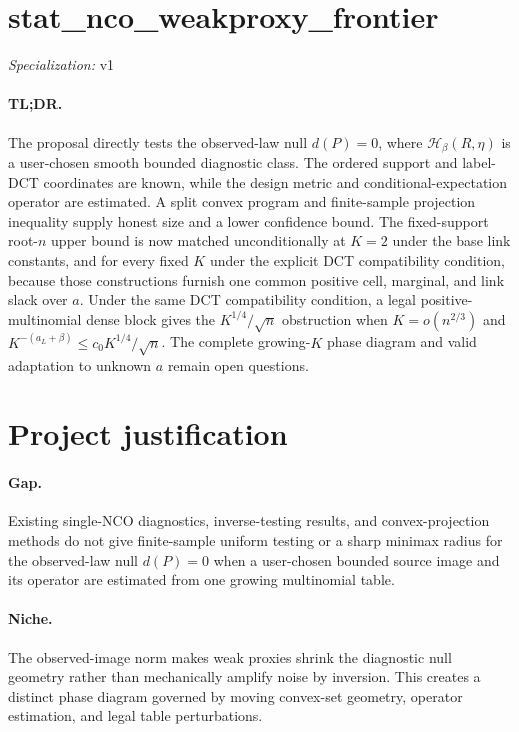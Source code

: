 \documentclass{article}
\begin{document}
\sloppy

\section*{stat\_\allowbreak{}nco\_\allowbreak{}weakproxy\_\allowbreak{}frontier}

\noindent\textit{Specialization:} v1\par

\paragraph{TL;DR.} The proposal directly tests the observed-law null \(d(P)=0\), where \(\mathcal H_\beta(R,\eta)\) is a user-chosen smooth bounded diagnostic class. The ordered support and label-DCT coordinates are known, while the design metric and conditional-expectation operator are estimated. A split convex program and finite-sample projection inequality supply honest size and a lower confidence bound. The fixed-support root-\(n\) upper bound is now matched unconditionally at \(K=2\) under the base link constants, and for every fixed \(K\) under the explicit DCT compatibility condition, because those constructions furnish one common positive cell, marginal, and link slack over \(a\). Under the same DCT compatibility condition, a legal positive-multinomial dense block gives the \(K^{1/4}/\sqrt n\) obstruction when \(K=o(n^{2/3})\) and \(K^{-(a_L+\beta)}\le c_0K^{1/4}/\sqrt n\). The complete growing-\(K\) phase diagram and valid adaptation to unknown \(a\) remain open questions.

\section{Project justification}

\paragraph{Gap.} Existing single-NCO diagnostics, inverse-testing results, and convex-projection methods do not give finite-sample uniform testing or a sharp minimax radius for the observed-law null \(d(P)=0\) when a user-chosen bounded source image and its operator are estimated from one growing multinomial table.

\paragraph{Niche.} The observed-image norm makes weak proxies shrink the diagnostic null geometry rather than mechanically amplify noise by inversion. This creates a distinct phase diagram governed by moving convex-set geometry, operator estimation, and legal table perturbations.
\end{document}

